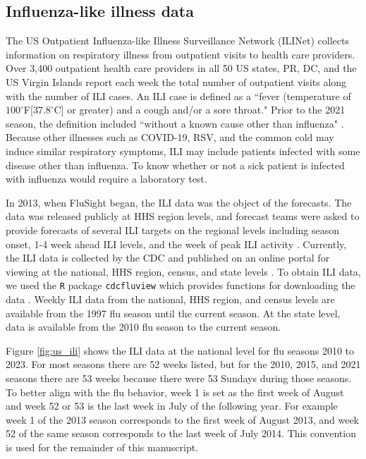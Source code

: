 \documentclass[ba]{imsart}
\theoremstyle{plain}
\theoremstyle{definition}
\theoremstyle{remark}
\begin{document}
\subsection{Influenza-like illness data}
The US Outpatient Influenza-like Illness Surveillance Network (ILINet) collects information on respiratory illness from outpatient visits to health care providers. Over 3,400 outpatient health care providers in all 50 US states, PR, DC, and the US Virgin Islands report each week the total number of outpatient visits along with the number of ILI cases. An ILI case is defined as a ``fever (temperature of $100^{\circ}$F[$37.8^{\circ}$C] or greater) and a cough and/or a sore throat." Prior to the 2021 season, the definition included ``without a known cause other than influenza" \cite[]{cdcfluview2023}. Because other illnesses such as COVID-19, RSV, and the common cold may induce similar respiratory symptoms, ILI may include patients infected with some disease other than influenza. To know whether or not a sick patient is infected with influenza would require a laboratory test. 

In 2013, when FluSight began, the ILI data was the object of the forecasts. The data was released publicly at HHS region levels, and forecast teams were asked to provide forecasts of several ILI targets on the regional levels including season onset, 1-4 week ahead ILI levels, and the week of peak ILI activity \cite[]{biggerstaff2016results,mcgowan2019collaborative}. Currently, the ILI data is collected by the CDC and published on an online portal for viewing at the national, HHS region, census, and state levels \cite[]{cdc2024fluviewportal}. To obtain ILI data, we used the \texttt{R} package \texttt{cdcfluview} which provides functions for downloading the data \cite[]{rudis2021cdcfluview}. Weekly ILI data from the national, HHS region, and census levels are available from the 1997 flu season until the current season. At the state level, data is available from the 2010 flu season to the current season. 

Figure \ref{fig:us_ili} shows the ILI data at the national level for flu seasons 2010 to 2023. For most seasons there are 52 weeks listed, but for the 2010, 2015, and 2021 seasons there are 53 weeks because there were 53 Sundays during those seasons. 
To better align with the flu behavior, week 1 is set as the first week of August and week 52 or 53 is the last week in July of the following year. For example week 1 of the 2013 season corresponds to the first week of August 2013, and week 52 of the same season corresponds to the last week of July 2014. This convention is used for the remainder of this manuscript. 
\end{document}
